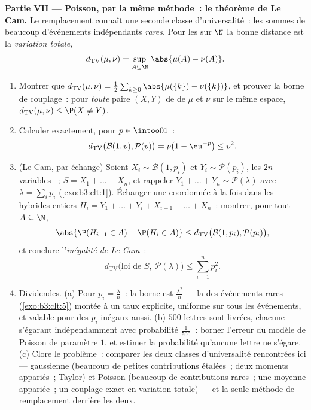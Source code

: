 \begin{problem}
\medskip
\noindent\textbf{Partie VII --- Poisson, par la même
méthode~: le théorème de Le Cam.} Le remplacement connaît
une seconde classe d'universalité~: les sommes de beaucoup
d'événements indépendants \emph{rares}. Pour les  sur
$\N$ la bonne distance est la \emph{variation totale},
\[
d_{\mathrm{TV}}(\mu, \nu) = \sup_{A\subseteq\N}\,
\abs{\mu(A) - \nu(A)} .
\]
\begin{enumerate}[resume]
  \item Montrer que $d_{\mathrm{TV}}(\mu, \nu) =
        \frac12\sum_{k\geq0}\abs{\mu(\{k\}) -
        \nu(\{k\})}$, et prouver la borne de couplage~: pour
        \emph{toute} paire $(X, Y)$ de 
        de  $\mu$ et $\nu$ sur le même espace,
        $d_{\mathrm{TV}}(\mu, \nu) \leq \P(X \neq Y)$.
  \item Calculer exactement, pour $p \in \intoo01$~:
        \[
        d_{\mathrm{TV}}\bigl(\mathcal B(1, p), \mathcal
        P(p)\bigr) = p\bigl(1 - \eu^{-p}\bigr) \leq p^2 .
        \]
  \item (Le Cam, par échange) Soient $X_i \sim \mathcal
        B(1, p_i)$ et $Y_i \sim \mathcal P(p_i)$, les $2n$
        variables ~; $S = X_1 + \dots + X_n$,
        et rappeler $Y_1 + \dots + Y_n \sim \mathcal
        P(\lambda)$ avec $\lambda = \sum_ip_i$
        (\cref{exo:b3:clt:1}). Échanger une coordonnée à la
        fois dans les hybrides entiers $H_i = Y_1 + \dots +
        Y_i + X_{i+1} + \dots + X_n$~: montrer, pour tout
        $A \subseteq \N$,
        \[
        \abs{\P(H_{i-1} \in A) - \P(H_i \in A)} \leq
        d_{\mathrm{TV}}\bigl(\mathcal B(1, p_i), \mathcal
        P(p_i)\bigr),
        \]
        et conclure l'\emph{inégalité de Le Cam}~:
        \[
        d_{\mathrm{TV}}\bigl(\text{loi de } S,\ \mathcal
        P(\lambda)\bigr) \leq \sum_{i=1}^np_i^2 .
        \]
  \item Dividendes. (a) Pour $p_i = \frac\lambda n$~: la
        borne est $\frac{\lambda^2}n$ --- la  des
        événements rares (\cref{exo:b3:clt:5}) montée à un
        taux explicite, uniforme sur tous les événements, et
        valable pour des $p_i$ inégaux aussi. (b) $500$
        lettres sont livrées, chacune s'égarant
        indépendamment avec probabilité $\frac1{500}$~:
        borner l'erreur du modèle de Poisson de paramètre
        $1$, et estimer la probabilité qu'aucune lettre ne
        s'égare. (c) Clore le problème~: comparer les deux
        classes d'universalité rencontrées ici ---
        gaussienne (beaucoup de petites contributions
        étalées~; deux moments appariés~; Taylor) et
        Poisson (beaucoup de contributions rares~; une
        moyenne appariée~; un couplage exact en variation
        totale) --- et la seule méthode de remplacement
        derrière les deux.


\end{enumerate}
\end{problem}
